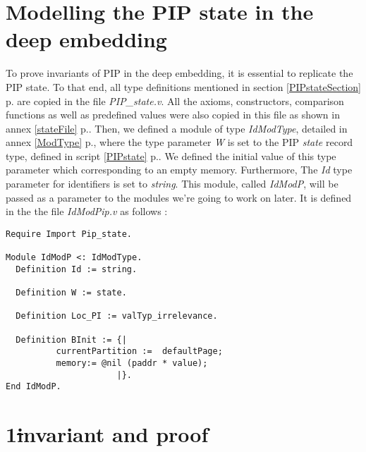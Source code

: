 \section{Modelling the PIP state in the deep embedding}
To prove invariants of PIP in the deep embedding, it is essential to replicate the PIP state. To that end, all type definitions mentioned in section \ref{PIPstateSection} p.\pageref{PIPstateSection} are copied in the file \textit{PIP\_state.v}. All the axioms, constructors, comparison functions as well as predefined values were also copied in this file as shown in annex \ref{stateFile} p.\pageref{stateFile}. Then, we defined a module of type \textit{IdModType}, detailed in annex \ref{ModType} p.\pageref{ModType}, where the type parameter \textit{W} is set to the PIP \textit{state} record type, defined in script \ref{PIPstate} p.\pageref{PIPstate}. We defined the initial value of this type parameter which corresponding to an empty memory. Furthermore, The \textit{Id} type parameter for identifiers is set to \textit{string}. This module, called \textit{IdModP}, will be passed as a parameter to the modules we're going to work on later. It is defined in the the file \textit{IdModPip.v} as follows :
\begin{lstlisting}[caption = {PIP state in the deep embedding}, xleftmargin=.1\textwidth,
xrightmargin=.1\textwidth]
Require Import Pip_state.

Module IdModP <: IdModType.
  Definition Id := string.
  
  Definition W := state.

  Definition Loc_PI := valTyp_irrelevance.

  Definition BInit := {|
          currentPartition :=  defaultPage;
          memory:= @nil (paddr * value);
                      |}.
End IdModP.
\end{lstlisting}

\section{1\st invariant and proof} 

